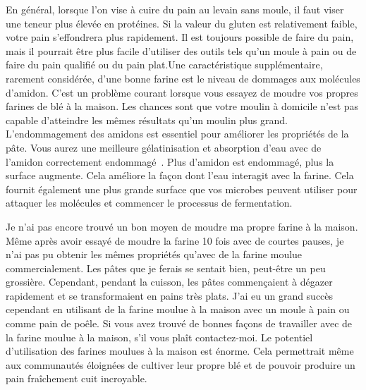 En général, lorsque l'on vise à cuire du pain au levain sans moule, il faut viser une teneur plus élevée en protéines. Si la valeur du gluten est relativement faible, votre pain s'effondrera plus rapidement. Il est toujours possible de faire du pain, mais il pourrait être plus facile d'utiliser des outils tels qu'un moule à pain ou de faire du pain qualifié ou du pain plat.Une caractéristique supplémentaire, rarement considérée, d'une bonne farine est le niveau de dommages aux molécules d'amidon. C'est un problème courant lorsque vous essayez de moudre vos propres farines de blé à la maison. Les chances sont que votre moulin à domicile n'est pas capable d'atteindre les mêmes résultats qu'un moulin plus grand. L'endommagement des amidons est essentiel pour améliorer les propriétés de la pâte. Vous aurez une meilleure gélatinisation et absorption d'eau avec de l'amidon correctement endommagé~\cite{starch+damage+flour}. Plus d'amidon est endommagé, plus la surface augmente. Cela améliore la façon dont l'eau interagit avec la farine. Cela fournit également une plus grande surface que vos microbes peuvent utiliser pour attaquer les molécules et commencer le processus de fermentation.

Je n'ai pas encore trouvé un bon moyen de moudre ma propre farine à la maison. Même après avoir essayé de moudre la farine 10 fois avec de courtes pauses, je n'ai pas pu obtenir les mêmes propriétés qu'avec de la farine moulue commercialement. Les pâtes que je ferais  se sentait bien, peut-être un peu grossière. Cependant, pendant la cuisson, les pâtes commençaient à dégazer rapidement et se transformaient en pains très plats. J'ai eu un grand succès cependant en utilisant de la farine moulue à la maison avec un moule à pain ou comme pain de poêle. Si vous avez trouvé de bonnes façons de travailler avec de la farine moulue à la maison, s'il vous plaît contactez-moi. Le potentiel d'utilisation des farines moulues à la maison est énorme. Cela permettrait même aux communautés éloignées de cultiver leur propre blé et de pouvoir produire un pain fraîchement cuit incroyable.